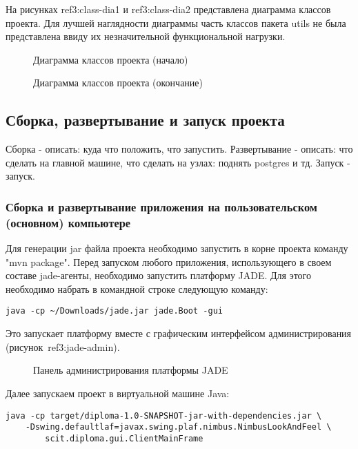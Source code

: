 На рисунках ref{3:class-dia1} и ref{3:class-dia2} представлена диаграмма классов проекта. Для лучшей наглядности диаграммы часть классов пакета utils не была представлена ввиду их незначительной функциональной нагрузки.

\begin{figure}[h]
\caption{Диаграмма классов проекта (начало)}
\label{3:class-dia1}
\end{figure}

\begin{figure}[h]
\caption{Диаграмма классов проекта (окончание)}
\label{3:class-dia2}
\end{figure}

\subsection{Сборка, развертывание и запуск проекта}
Сборка - описать: куда что положить, что запустить.
Развертывание - описать: что сделать на главной машине, что сделать на узлах: поднять postgres и тд.
Запуск - запуск.

\subsubsection{Сборка и развертывание приложения на пользовательском (основном) компьютере}
Для генерации jar файла проекта необходимо запустить в корне проекта команду "mvn package". 
Перед запуском любого приложения, использующего в своем составе jade-агенты, необходимо запустить платформу JADE. Для этого необходимо набрать в командной строке следующую команду:
\begin{lstlisting}
java -cp ~/Downloads/jade.jar jade.Boot -gui
\end{lstlisting}
Это запускает платформу вместе с графическим интерфейсом администрирования (рисунок~ref{3:jade-admin}).
\begin{figure}[h]
\caption{Панель администрирования платформы JADE}
\label{3:jade-admin}
\end{figure}

Далее запускаем проект в виртуальной машине Java:
\begin{lstlisting}
java -cp target/diploma-1.0-SNAPSHOT-jar-with-dependencies.jar \
    -Dswing.defaultlaf=javax.swing.plaf.nimbus.NimbusLookAndFeel \
        scit.diploma.gui.ClientMainFrame
\end{lstlisting}

